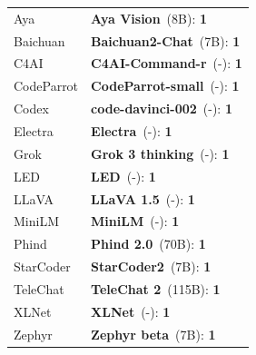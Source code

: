 \begin{tabular} { p{} p{} }
Aya & \textbf{Aya Vision}~(8B): \textbf{1} \cite{ \papertwohundredthirtyninth }\\ 
Baichuan & \textbf{Baichuan2-Chat}~(7B): \textbf{1} \cite{ \papersixtyfifth }\\ 
C4AI & \textbf{C4AI-Command-r}~(-): \textbf{1} \cite{ \papertwentyeighth }\\ 
CodeParrot & \textbf{CodeParrot-small}~(-): \textbf{1} \cite{ \papersixtyseventh }\\ 
Codex & \textbf{code-davinci-002}~(-): \textbf{1} \cite{ \paperonehundrednineteenth }\\ 
Electra & \textbf{Electra}~(-): \textbf{1} \cite{ \paperonehundredninetysixth }\\ 
Grok & \textbf{Grok 3 thinking}~(-): \textbf{1} \cite{ \papertwohundredtwentyfifth }\\ 
LED & \textbf{LED}~(-): \textbf{1} \cite{ \papertwohundredthirtysecond }\\ 
LLaVA & \textbf{LLaVA 1.5}~(-): \textbf{1} \cite{ \papertwohundredthirtyseventh }\\ 
MiniLM & \textbf{MiniLM}~(-): \textbf{1} \cite{ \paperonehundredninetysixth }\\ 
Phind & \textbf{Phind 2.0}~(70B): \textbf{1} \cite{ \papertwohundredtwentyfifth }\\ 
StarCoder & \textbf{StarCoder2}~(7B): \textbf{1} \cite{ \paperonehundredeightyeighth }\\ 
TeleChat & \textbf{TeleChat 2}~(115B): \textbf{1} \cite{ \papertwohundredthirtyfifth }\\ 
XLNet & \textbf{XLNet}~(-): \textbf{1} \cite{ \paperonehundredninetysixth }\\ 
Zephyr & \textbf{Zephyr beta}~(7B): \textbf{1} \cite{ \papertwohundredfortieth }\\ 
\bottomrule 
\end{tabular} 
